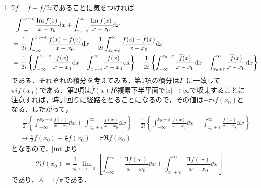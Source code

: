 \documentclass[a4paper,pdflatex,ja=standard]{bxjsarticle}
\begin{document}
\begin{enumerate}
\begin{enumerate}
    \item 
    $\Im f=f-\overline{f}/2i$であることに気をつければ
    \begin{align}
      &\hspace*{5pt}
      \nonumber
      \int_{-\infty}^{x_{0}-\varepsilon}
      \frac{\Im f(x)}{x-x_{0}}
      \dd x
      +
      \int_{x_{0}+\varepsilon}^{\infty}
      \frac{\Im f(x)}{x-x_{0}}
      \dd x
      \\
      \nonumber
      &=
      \frac{1}{2i}\int_{-\infty}^{x_{0}-\varepsilon}
      \frac{f(x)-\overline{f}(x)}{x-x_{0}}
      \dd x
      +
      \frac{1}{2i}\int_{x_{0}+\varepsilon}^{\infty}
      \frac{f(x)-\overline{f}(x)}{x-x_{0}}
      \dd x
      \\
      &=
      \frac{1}{2i}
      \left\{ \int_{-\infty}^{x_{0}-\varepsilon}
      \frac{f(x)}{x-x_{0}}
      \dd x
      +
      \int_{x_{0}+\varepsilon}^{\infty}
      \frac{f(x)}{x-x_{0}}
      \dd x \right\}
      -
      \frac{1}{2i}
      \left\{ \int_{-\infty}^{x_{0}-\varepsilon}
      \frac{\overline{f}(x)}{x-x_{0}}
      \dd x
      +
      \int_{x_{0}+\varepsilon}^{\infty}
      \frac{\overline{f}(x)}{x-x_{0}}
      \dd x \right\}
      \label{int}
    \end{align}
    である．それぞれの積分を考えてみる．第1項の積分は$I_{-}$に一致して$\pi if(x_{0})$である．第2項は$\overline{f}(x)$が複素下半平面で$|z|\rightarrow\infty$で収束することに注意すれば，時計回りに経路をとることになるので，その値は$-\pi i\overline{f}(x_0)$となる．したがって，
    \begin{align}
      \nonumber&\hspace{5pt}
      \frac{1}{2i}
      \left\{ \int_{-\infty}^{x_{0}-\varepsilon}
      \frac{f(x)}{x-x_{0}}
      \dd x
      +
      \int_{x_{0}+\varepsilon}^{\infty}
      \frac{f(x)}{x-x_{0}}
      \dd x \right\}
      -
      \frac{1}{2i}
      \left\{ \int_{-\infty}^{x_{0}-\varepsilon}
      \frac{\overline{f}(x)}{x-x_{0}}
      \dd x
      +
      \int_{x_{0}+\varepsilon}^{\infty}
      \frac{\overline{f}(x)}{x-x_{0}}
      \dd x \right\}
      \\
      &
      \rightarrow
      \frac{\pi}{2} f(x_{0})+\frac{\pi}{2} \overline{f}(x_{0})
      =
      \pi \Re f(x_{0})
    \end{align}
    となるので，\eqref{int}より
    \begin{equation}
      \Re f(x_{0})
      =
      \frac{1}{\pi}\lim_{\varepsilon\rightarrow +0}
      \left[ \int_{-\infty}^{x_{0}-\varepsilon}
      \frac{\Im f(x)}{x-x_{0}}
      \dd x
      +
      \int_{x_{0}+\varepsilon}^{\infty}
      \frac{\Im f(x)}{x-x_{0}}
      \dd x \right]
    \end{equation}
    であり，$A=1/\pi$である．
  \end{enumerate}


\end{enumerate}
\end{document}
